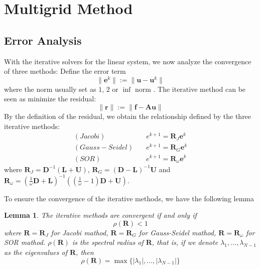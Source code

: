 \documentclass[onecolumn, conference]{IEEEtran}
\newtheorem{lemma}{Lemma}
\begin{document}
\section{Multigrid Method}
\subsection{Error Analysis}
With the iterative solvers for the linear system, we now analyze the convergence of three methods: Define the error term 
\begin{equation}
    \|\mathbf{e}^k\|:=\|\mathbf{u}-\mathbf{u}^k\|
\end{equation}
where the norm usually set as $1$, $2$ or $\inf$ norm . The iterative method can be seen as minimize the residual: 
\begin{equation}
    \|\mathbf{r}\|:=\|\mathbf{f}-\mathbf{A}\mathbf{u}\|
\end{equation}
By the definition of the residual, we obtain the relationship defined by the three iterative methods:
\begin{align}
    (Jacobi)&\quad e^{k+1}=\mathbf{R}_J\mathbf{e}^k\\
    (Gauss-Seidel)&\quad e^{k+1}=\mathbf{R}_G\mathbf{e}^k\\
    (SOR)&\quad e^{k+1}=\mathbf{R}_\omega\mathbf{e}^k
\end{align}
where $\mathbf{R}_J=\mathbf{D}^{-1}\left(\mathbf{L}+\mathbf{U}\right)$, $\mathbf{R}_G=\left(\mathbf{D}-\mathbf{L}\right)^{-1}\mathbf{U}$ and $\mathbf{R}_\omega=\left(\frac{1}{\omega}\mathbf{D}+\mathbf{L}\right)^{-1}\left(\left(\frac{1}{\omega}-1\right)\mathbf{D}+\mathbf{U}\right)$.

To ensure the convergence of the iterative methods, we have the following lemma
\begin{lemma}
    The iterative methods are convergent if and only if 
    \begin{equation}
        \rho(\mathbf{R})<1
    \end{equation}
    where $\mathbf{R}=\mathbf{R}_J$ for Jacobi mathod, $\mathbf{R}=\mathbf{R}_G$ for Gauss-Seidel mathod, $\mathbf{R}=\mathbf{R}_\omega$ for SOR mathod. $\rho(\mathbf{R})$ is the spectral radius of $\mathbf{R}$, that is, if we denote $\lambda_1,\dots,\lambda_{N-1}$ as the eigenvalues of $\mathbf{R}$, then
    \begin{equation}
        \rho(\mathbf{R})=\max\{|\lambda_1|,\dots,|\lambda_{N-1}|\}
    \end{equation}
\end{lemma}
\end{document}

